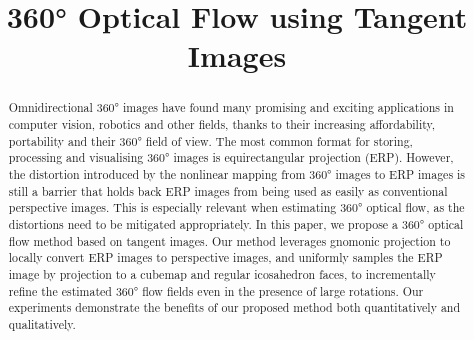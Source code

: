 \documentclass{bmvc2k}
\title{360\!° Optical Flow using Tangent Images}
\begin{document}
\maketitle

\begin{abstract}
\noindent
Omnidirectional 360° images have found many promising and exciting applications in computer vision, robotics and other fields, thanks to their increasing affordability, portability and their 360° field of view.
The most common format for storing, processing and visualising 360° images is equirectangular projection (ERP).
However, the distortion introduced by the nonlinear mapping from 360° images to ERP images is still a barrier that holds back ERP images from being used as easily as conventional perspective images.
This is especially relevant when estimating 360° optical flow, as the distortions need to be mitigated appropriately.
In this paper, we propose a 360° optical flow method based on tangent images.
Our method leverages gnomonic projection to locally convert ERP images to perspective images, and uniformly samples the ERP image by projection to a cubemap and regular icosahedron faces, to incrementally refine the estimated 360° flow fields even in the presence of large rotations.
Our experiments demonstrate the benefits of our proposed method both quantitatively and qualitatively.
\end{abstract}











\clearpage

\begin{appendices}

\end{appendices}

\clearpage
\end{document}
